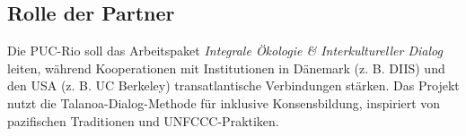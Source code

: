 \documentclass[a4paper,12pt]{article}
\begin{document}
\subsection*{Rolle der Partner}
Die PUC-Rio soll das Arbeitspaket \textit{Integrale Ökologie \& Interkultureller Dialog} leiten, während Kooperationen mit Institutionen in Dänemark (z. B. DIIS) und den USA (z. B. UC Berkeley) transatlantische Verbindungen stärken. Das Projekt nutzt die Talanoa-Dialog-Methode für inklusive Konsensbildung, inspiriert von pazifischen Traditionen und UNFCCC-Praktiken.
\end{document}
